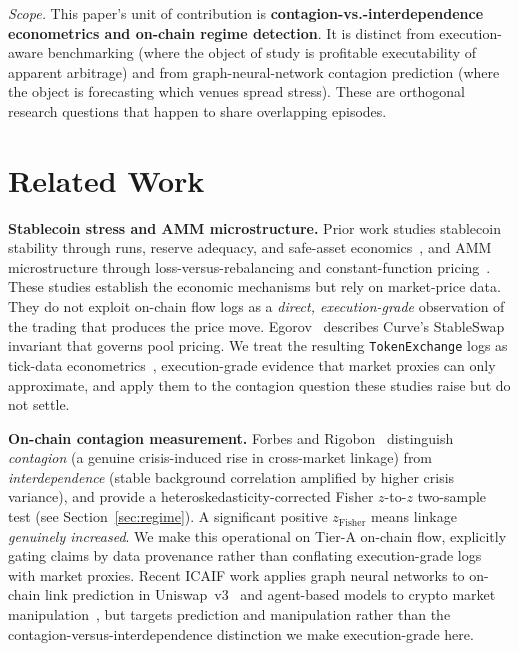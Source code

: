 \documentclass[sigconf,anonymous]{acmart}
\begin{document}
\textit{Scope.} This paper's unit of contribution is \textbf{contagion-vs.-interdependence
econometrics and on-chain regime detection}. It is distinct from execution-aware
benchmarking (where the object of study is profitable executability of apparent arbitrage) and from
graph-neural-network contagion prediction (where the object is forecasting which venues spread
stress). These are orthogonal research questions that happen to share overlapping episodes.


\section{Related Work}
\label{sec:related}

\textbf{Stablecoin stress and AMM microstructure.}  Prior work studies stablecoin
stability through runs, reserve adequacy, and safe-asset economics~\cite{Gorton2023,Lyons2023,Cao2024},
and AMM microstructure through loss-versus-rebalancing and constant-function pricing~\cite{Milionis2022,Angeris2020}.  These studies establish the economic mechanisms
but rely on market-price data. They do not exploit on-chain flow logs as a
\emph{direct, execution-grade} observation of the trading that produces the price
move.  Egorov~\cite{Egorov2019} describes Curve's StableSwap invariant that governs
pool pricing. We treat the resulting \texttt{TokenExchange} logs as tick-data
econometrics~\cite{AitSahalia2010}, execution-grade evidence that market proxies
can only approximate, and apply them to the contagion question these studies raise
but do not settle.

\textbf{On-chain contagion measurement.}  Forbes and Rigobon~\cite{Forbes2002}
distinguish \emph{contagion} (a genuine crisis-induced rise in cross-market linkage)
from \emph{interdependence} (stable background correlation amplified by higher crisis variance),
and provide a heteroskedasticity-corrected Fisher $z$-to-$z$ two-sample test (see Section~\ref{sec:regime}).
A significant positive $z_{\text{Fisher}}$ means linkage \emph{genuinely increased}.
We make this operational on Tier-A on-chain
flow, explicitly gating claims by data provenance rather than conflating
execution-grade logs with market proxies.  Recent ICAIF work applies graph neural
networks to on-chain link prediction in Uniswap~v3~\cite{zhou2025bridge} and
agent-based models to crypto market manipulation~\cite{gu2024spoofability}, but
targets prediction and manipulation rather than the contagion-versus-interdependence
distinction we make execution-grade here.
\end{document}
